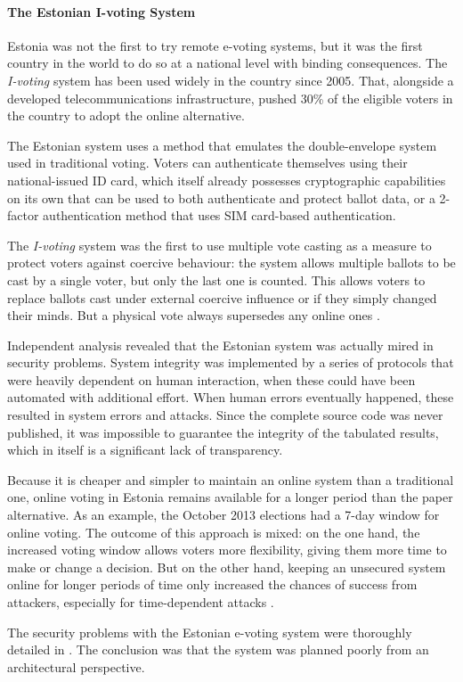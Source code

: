 \documentclass[../access.tex]{subfiles}
\begin{document}
    \paragraph{The Estonian I-voting System}
    \label{estonia_i_voting}
    Estonia was not the first to try remote e-voting systems, but it was the first country in the world to do so at a national level with binding consequences. The \textit{I-voting} system has been used widely in the country since 2005. That, alongside a developed telecommunications infrastructure, pushed 30\% of the eligible voters in the country to adopt the online alternative.
    \par
    The Estonian system uses a method that emulates the double-envelope system used in traditional voting. Voters can authenticate themselves using their national-issued ID card, which itself already possesses cryptographic capabilities on its own that can be used to both authenticate and protect ballot data, or a 2-factor authentication method that uses SIM card-based authentication.
    \par
    The \textit{I-voting} system was the first to use multiple vote casting as a measure to protect voters against coercive behaviour: the system allows multiple ballots to be cast by a single voter, but only the last one is counted. This allows voters to replace ballots cast under external coercive influence or if they simply changed their minds. But a physical vote always supersedes any online ones \cite{Heiberg2015}.
    \par
    Independent analysis revealed that the Estonian system was actually mired in security problems. System integrity was implemented by a series of protocols that were heavily dependent on human interaction, when these could have been automated with additional effort. When human errors eventually happened, these resulted in system errors and attacks. Since the complete source code was never published, it was impossible to guarantee the integrity of the tabulated results, which in itself is a significant lack of transparency.
    \par
    Because it is cheaper and simpler to maintain an online system than a traditional one, online voting in Estonia remains available for a longer period than the paper alternative. As an example, the October 2013 elections had a 7-day window for online voting. The outcome of this approach is mixed: on the one hand, the increased voting window allows voters more flexibility, giving them more time to make or change a decision. But on the other hand, keeping an unsecured system online for longer periods of time only increased the chances of success from attackers, especially for time-dependent attacks \cite{Madise2006}.
    \par
    The security problems with the Estonian e-voting system were thoroughly detailed in \cite{Finkenauer2014}. The conclusion was that the system was planned poorly from an architectural perspective.
    
\end{document}
